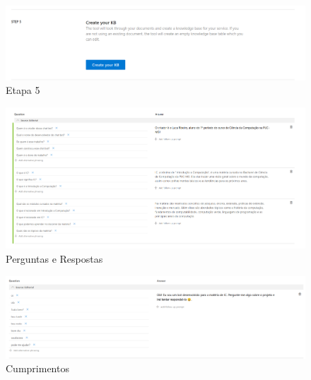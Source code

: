 \documentclass[12pt]{article}
\begin{document}
\begin{figure}[ht]
\centering
\includegraphics[width=1\textwidth]{images/KnowledgeBase_5.png}
\caption{Etapa 5}
\label{fig:exampleFig1}
\end{figure}

\begin{figure}[ht]
\centering
\includegraphics[width=1\textwidth]{images/Perguntas Respostas_1.png}
\caption{Perguntas e Respostas}
\label{fig:exampleFig1}
\end{figure}

\begin{figure}[ht]
\centering
\includegraphics[width=1\textwidth]{images/Perguntas Respostas_2.png}
\caption{Cumprimentos}
\label{fig:exampleFig1}
\end{figure}
\end{document}
